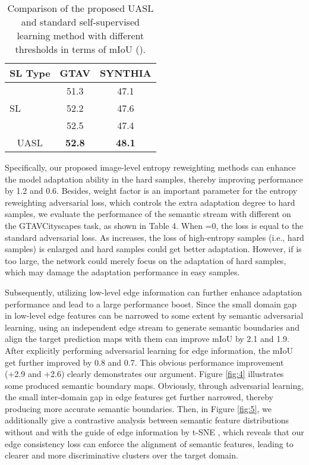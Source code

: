 \documentclass[sigconf]{acmart}
\begin{document}
\begin{table}
    \caption{Comparison of the proposed UASL and standard self-supervised learning method with different thresholds  in terms of mIoU ().}
    \centering
    \begin{tabular}{l|l|cc}
    \toprule
    \multicolumn{2}{c|}{SL Type}  & GTAV & SYNTHIA \\
    \hline
    \multirow{3}{*}{SL} &   & 51.3   & 47.1   \\
    ~ &      & 52.2  & 47.6     \\
    ~ &      & 52.5 &  47.4  \\
    \hline
    \multicolumn{2}{c|}{UASL}  & \textbf{52.8}  & \textbf{48.1}     \\
    \toprule
    \end{tabular}
    
    \label{tab:5}
\end{table}
\par Specifically, our proposed image-level entropy reweighting methods can enhance the model adaptation ability in the hard samples, thereby improving performance by 1.2 and 0.6. Besides, weight factor  is an important parameter for the entropy reweighting adversarial loss, which controls the extra adaptation degree to hard samples, we evaluate the performance of the semantic stream with different  on the GTAVCityscapes task, as shown in Table 4. When =0, the loss is equal to the standard adversarial loss. As  increases, the loss of high-entropy samples (i.e., hard samples) is enlarged and hard samples could get better adaptation. However, if  is too large, the network could merely focus on the adaptation of hard samples, which may damage the adaptation performance in easy samples. 

\par Subsequently, utilizing low-level edge information can further enhance adaptation performance and lead to a large performance boost. Since the small domain gap in low-level edge features can be narrowed to some extent by semantic adversarial learning, using an independent edge stream to generate semantic boundaries and align the target prediction maps with them can improve mIoU by 2.1 and 1.9. After explicitly performing adversarial learning for edge information, the mIoU get further improved by 0.8 and 0.7. This obvious performance improvement (+2.9 and +2.6) clearly demonstrates our argument. Figure \ref{fig:4} illustrates some produced semantic boundary maps. Obviously, through adversarial learning, the small inter-domain gap in edge features get further narrowed, thereby producing more accurate semantic boundaries. Then, in Figure \ref{fig:5}, we additionally give a contrastive analysis between semantic feature distributions without and with the guide of edge information by t-SNE \cite{van2008visualizing}, which reveals that our edge consistency loss can enforce the alignment of semantic features, leading to clearer and more discriminative clusters over the target domain. 
\end{document}
